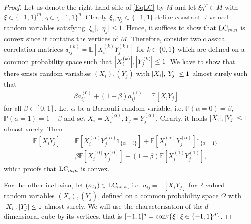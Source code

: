 \begin{proof}
	Let us denote the right hand side of \ref{EqLC} by $ M $ and let $ \xi\eta^T \in M $ with $ \xi \in \{-1,1\}^m, \eta \in \{-1,1\}^n $. Clearly $ \xi_i, \eta_j \in \{-1,1\} $ define constant $ \mathbb{R} $-valued random variables satisfying $ \vert \xi_i \vert, \, \vert \eta_j \vert \le 1 $. Hence, it suffices to show that $ \textup{LC}_{m,n} $ is convex since it contains the vertices of $ M $. Therefore, consider two classical correlation matrices $ a_{ij}^{(k)} = \mathbb{E}[X_i^{(k)}Y_{j}^{(k)}] $ for $ k \in \{0,1\} $ which are defined on a common probability space such that $ {\left|{X_i^{(k)}}\right|},{\left|{Y_j^{(k)}}\right|} \le 1 $. We have to show that there exists random variables $ (X_i),(Y_j) $ with $ {\left|{X_i}\right|},{\left|{Y_j}\right|} \le 1 $ almost surely such that
	\begin{align*}
		\beta a_{ij}^{(0)}+ (1-\beta)a_{ij}^{(1)} = \mathbb{E}[X_iY_j]
	\end{align*}
	for all $ \beta \in [0,1] $.
	Let $ \alpha $ be a Bernoulli random variable, i.e. $ \mathbb{P}(\alpha = 0) = \beta $, $ \mathbb{P}(\alpha = 1) = 1 - \beta$ and set $ X_i = X_i^{(\alpha)}, Y_j = Y_j^{(\alpha)} $.
	Clearly, it holds $ {\left|{X_i}\right|}, {\left|{Y_j}\right|} \le 1 $ almost surely. 
	Then 
	\begin{align*}
		\mathbb{E}[X_iY_j] &= \mathbb{E}[X_i^{(\alpha)}Y_j^{(\alpha)}  \mathds{1}_{ \{\alpha = 0\}}] + \mathbb{E}[X_i^{(\alpha)}Y_j^{(\alpha)}]\mathds{1}_{\{\alpha = 1\}}] \\
		&= \beta \mathbb{E}[X_i^{(0)}Y_j^{(0)} ] + (1-\beta) \mathbb{E}[X_i^{(1)}Y_j^{(1)}],
	\end{align*} 
	which proofs that $ \textup{LC}_{m,n} $ is convex.
	
	
	
	For the other inclusion, let $ (a_{ij}) \in \textup{LC}_{m,n} $, i.e. $ a_{ij} = \mathbb{E}[X_iY_j] $ for $ \mathbb{R} $-valued random variables $ (X_i),(Y_j) $, defined on a common probability space $ \Omega $ with $ {\left|{X_i}\right|},{\left|{Y_j}\right|} \le 1 $ almost surely. 
	We will use the characterization of the $ d-$dimensional cube by its vertices, that is $ [-1,1]^d = \textup{conv} \{\xi \, | \, \xi \in \{-1,1 \}^d \}$.
	 

\end{proof}
